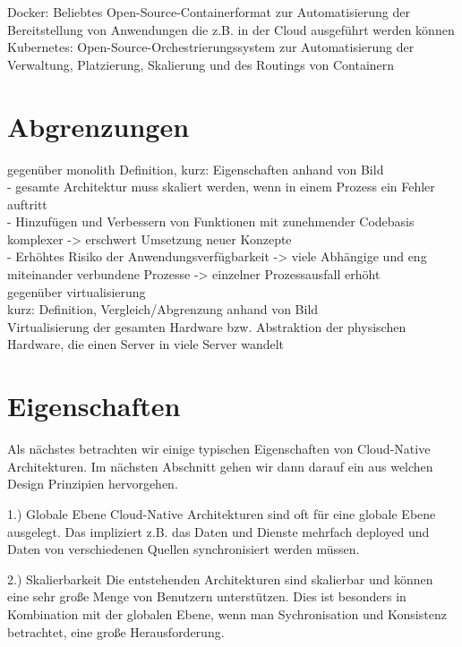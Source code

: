 Docker: Beliebtes Open-Source-Containerformat zur Automatisierung der Bereitstellung von Anwendungen die z.B. in der Cloud ausgeführt werden können\\

Kubernetes: Open-Source-Orchestrierungssystem zur Automatisierung der Verwaltung, Platzierung, Skalierung und des Routings von Containern\\

\section{Abgrenzungen}
gegenüber monolith
Definition, kurz: Eigenschaften anhand von Bild\\

- gesamte Architektur muss skaliert werden, wenn in einem Prozess ein Fehler auftritt\\
- Hinzufügen und Verbessern von Funktionen mit zunehmender Codebasis komplexer
 -> erschwert Umsetzung neuer Konzepte\\
- Erhöhtes Risiko der Anwendungsverfügbarkeit -> viele Abhängige und eng miteinander verbundene Prozesse -> einzelner Prozessausfall erhöht\\

gegenüber virtualisierung\\
kurz: Definition, Vergleich/Abgrenzung anhand von Bild\\

Virtualisierung der gesamten Hardware bzw. Abstraktion der physischen Hardware, die einen Server in viele Server wandelt\\

\section{Eigenschaften}
Als nächstes betrachten wir einige typischen Eigenschaften von Cloud-Native Architekturen. Im nächsten Abschnitt gehen wir dann darauf ein aus welchen Design Prinzipien hervorgehen.

1.) Globale Ebene
Cloud-Native Architekturen sind oft für eine globale Ebene ausgelegt. Das impliziert z.B. das Daten und Dienste mehrfach deployed und Daten von verschiedenen Quellen synchronisiert werden müssen.

2.) Skalierbarkeit
Die entstehenden Architekturen sind skalierbar und können eine sehr große Menge von Benutzern unterstützen. Dies ist besonders in Kombination mit der globalen Ebene, wenn man Sychronisation und Konsistenz betrachtet, eine große Herausforderung.

